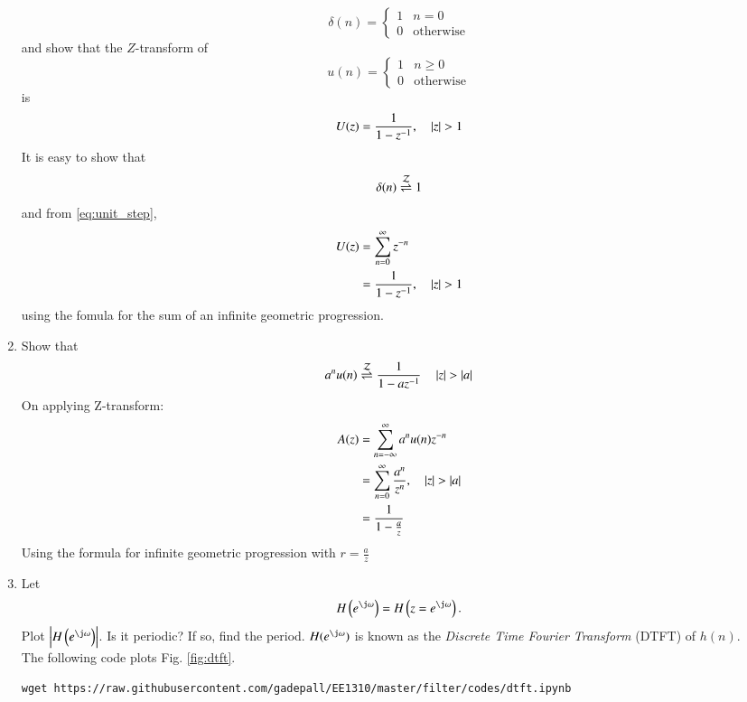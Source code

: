 \documentclass[journal,12pt,twocolumn]{IEEEtran}
\renewcommand\thesection{\arabic{section}}
\begin{document}
\begin{enumerate}[label=\thesection.\arabic*]
\begin{equation}
\delta(n)
=
\begin{cases}
1 & n = 0
\\
0 & \text{otherwise}
\end{cases}
\end{equation}
and show that the $Z$-transform of
\begin{equation}
\label{eq:unit_step}
u(n)
=
\begin{cases}
1 & n \ge 0
\\
0 & \text{otherwise}
\end{cases}
\end{equation}
is
\begin{equation}
U(z) = \frac{1}{1-z^{-1}}, \quad \left\vert z\right\vert > 1
\end{equation}
\solution It is easy to show that
\begin{equation}
\delta(n) \overset{\mathcal{Z}}{ \rightleftharpoons} 1
\end{equation}
and from \eqref{eq:unit_step},
\begin{align}
U(z) &= \sum _{n= 0}^{\infty}z^{-n}
\\
&=\frac{1}{1-z^{-1}}, \quad \left\vert z\right\vert > 1
\end{align}
using the fomula for the sum of an infinite geometric progression.
%
\item Show that 
\begin{equation}
\label{eq:anun}
a^nu(n) \overset{\mathcal{Z}}{ \rightleftharpoons} \frac{1}{1-az^{-1}} \quad \left\vert z\right\vert > \left\vert a\right\vert
\end{equation}
\solution On applying Z-transform:
\begin{align}
	A(z) &= \sum _{n= -{\infty}}^{\infty}a^nu(n)z^{-n}
	\\
	&=\sum _{n= 0}^{\infty}\frac{a^n}{z^{n}}, \quad \left\vert z\right\vert > \left\vert a\right\vert
	\\
	&= \frac{1}{1-\frac{a}{z}}
\end{align}
Using the formula for infinite geometric progression with $r = \frac{a}{z}$
\item 
Let
\begin{equation}
H\brak{e^{\j \omega}} = H\brak{z = e^{\j \omega}}.
\end{equation}
Plot $\abs{H\brak{e^{\j \omega}}}$.  Is it periodic? If so, find the period. $H(e^{\j \omega})$ is
known as the {\em Discrete Time Fourier Transform} (DTFT) of $h(n)$.
\\
\solution The following code plots Fig. \ref{fig:dtft}.
\begin{lstlisting}
wget https://raw.githubusercontent.com/gadepall/EE1310/master/filter/codes/dtft.ipynb
\end{lstlisting}

\end{enumerate}
\end{document}

